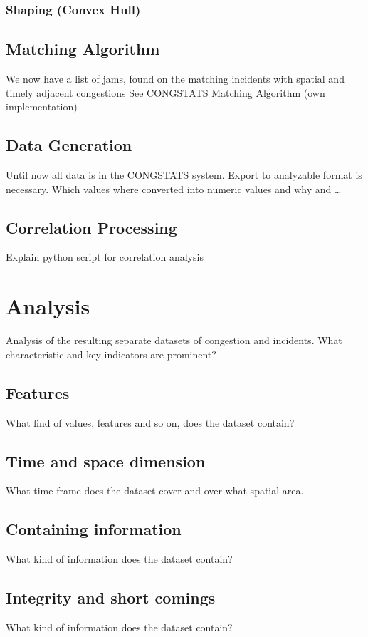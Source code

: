 \documentclass[a4paper,12pt]{report}
\begin{document}
\subsection{Shaping (Convex Hull)}

\section{Matching Algorithm}
We now have a list of jams, found on the matching incidents with spatial and timely adjacent congestions
See CONGSTATS Matching Algorithm (own implementation)
\section{Data Generation}
\label{methodology_data_generation}
Until now all data is in the CONGSTATS system. Export to analyzable format is necessary.
Which values where converted into numeric values and why and …
\section{Correlation Processing}
\label{definition_correlation_script}

Explain python script for correlation analysis

\chapter{Analysis}

Analysis of the resulting separate datasets of congestion and incidents. What characteristic and key indicators are prominent?
\section{Features}
What find of values, features and so on, does the dataset contain?
\section{Time and space dimension}
What time frame does the dataset cover and over what spatial area.
\section{Containing information}
What kind of information does the dataset contain?
\section{Integrity and short comings}
What kind of information does the dataset contain?
\end{document}
